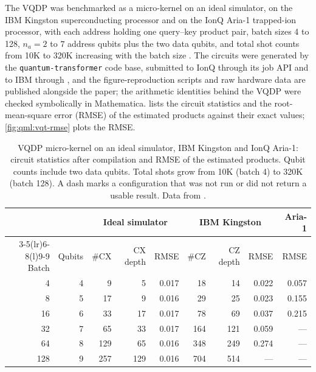 The VQDP was benchmarked as a micro-kernel on an ideal simulator, on the IBM Kingston superconducting processor and on the IonQ Aria-1 trapped-ion processor, with each address holding one query--key product pair, batch sizes 4 to 128, $n_a = 2$ to $7$ address qubits plus the two data qubits, and total shot counts from 10K to 320K increasing with the batch size \cite{guo2025vqt}. The circuits were generated by the \texttt{quantum-transformer} code base, submitted to IonQ through its job API and to IBM through \qiskit{}, and the figure-reproduction scripts and raw hardware data are published alongside the paper; the arithmetic identities behind the VQDP were checked symbolically in Mathematica.  lists the circuit statistics and the root-mean-square error (RMSE) of the estimated products against their exact values; \cref{fig:qml:vqt-rmse} plots the RMSE.

\begin{table}[htbp]
\caption{VQDP micro-kernel on an ideal simulator, IBM Kingston and IonQ Aria-1: circuit statistics after compilation and RMSE of the estimated products. Qubit counts include two data qubits. Total shots grow from 10K (batch 4) to 320K (batch 128). A dash marks a configuration that was not run or did not return a usable result. Data from \cite{guo2025vqt}.}\label{tab:qml:vqt-hw}
\centering
\footnotesize
\begin{tabular}{@{}rr rrr rrr r@{}}
\toprule
& & \multicolumn{3}{c}{Ideal simulator} & \multicolumn{3}{c}{IBM Kingston} & Aria-1 \\
\cmidrule(lr){3-5}\cmidrule(lr){6-8}\cmidrule(l){9-9}
Batch & Qubits & \#CX & CX depth & RMSE & \#CZ & CZ depth & RMSE & RMSE \\
\midrule
4   & 4 & 9   & 5   & 0.017 & 18  & 14  & 0.022 & 0.057 \\
8   & 5 & 17  & 9   & 0.016 & 29  & 25  & 0.023 & 0.155 \\
16  & 6 & 33  & 17  & 0.017 & 78  & 69  & 0.037 & 0.215 \\
32  & 7 & 65  & 33  & 0.017 & 164 & 121 & 0.059 & --- \\
64  & 8 & 129 & 65  & 0.016 & 348 & 249 & 0.274 & --- \\
128 & 9 & 257 & 129 & 0.016 & 704 & 514 & ---   & --- \\
\bottomrule
\end{tabular}
\end{table}

